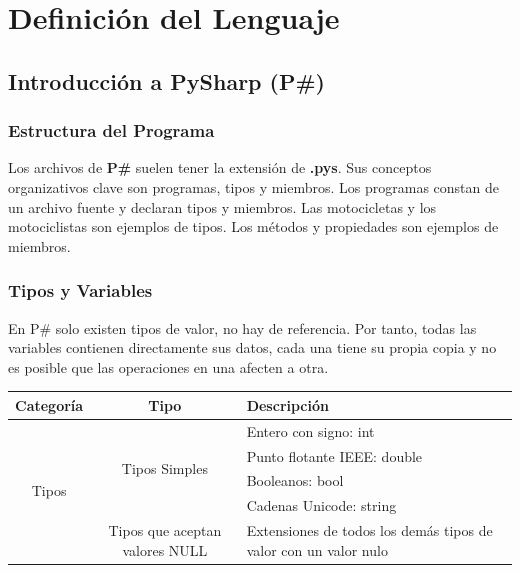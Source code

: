 \documentclass[12pt, letterpaper,spanish]{article}
\theoremstyle{definition}
\theoremstyle{remark}
\begin{document}
\newpage

\section{Definición del Lenguaje {\footnotesize \cite{conferenciasC}\cite{ullman}}}
	\subsection{Introducción a PySharp (P\#)}

		\subsubsection{Estructura del Programa}
		Los archivos de \textbf{P\#} suelen tener la extensión de \textbf{.pys}. Sus conceptos organizativos clave son programas, tipos y miembros. Los programas constan de un archivo fuente y declaran tipos y miembros. Las motocicletas y los motociclistas son ejemplos de tipos. Los métodos y propiedades son ejemplos de miembros.
	
	\subsubsection{Tipos y Variables}
	En P\# solo existen tipos de valor, no hay de referencia. Por tanto, todas las variables contienen directamente sus datos, cada una tiene su propia copia y no es posible que las operaciones en una afecten a otra.\par
	\begin{center}
		\begin{tabular}{| c | c | m{5cm} | }
			\hline
			Categoría & Tipo & Descripción \\ \hline
			\multirow{5}{*}{Tipos} & \multirow{4}{*}{Tipos Simples} & Entero con signo: int \\ \cline{3-3}
			&  & Punto flotante IEEE: double \\ \cline{3-3}
			&  & Booleanos: bool \\ \cline{3-3}
			&  & Cadenas Unicode: string \\ \cline{2-3}
			& Tipos que aceptan valores NULL & Extensiones de todos los demás tipos de valor con un valor nulo \\ \hline
		\end{tabular}
	\end{center}
\end{document}
